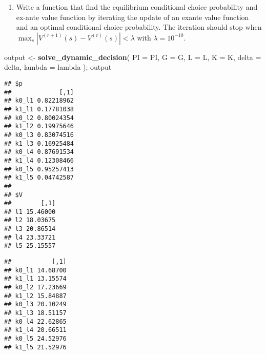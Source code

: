 \documentclass[
]{book}
\newenvironment{Shaded}{\begin{snugshade}}{\end{snugshade}}
\newcommand{\AttributeTok}[1]{\textcolor[rgb]{0.13,0.29,0.53}{#1}}
\newcommand{\FunctionTok}[1]{\textcolor[rgb]{0.13,0.29,0.53}{\textbf{#1}}}
\newcommand{\NormalTok}[1]{#1}
\newcommand{\OtherTok}[1]{\textcolor[rgb]{0.56,0.35,0.01}{#1}}
\newcommand{\SpecialCharTok}[1]{\textcolor[rgb]{0.81,0.36,0.00}{\textbf{#1}}}
\providecommand{\tightlist}{%
  \setlength{\itemsep}{0pt}\setlength{\parskip}{0pt}}
\begin{document}
\begin{enumerate}
\def\labelenumi{\arabic{enumi}.}
\setcounter{enumi}{5}
\tightlist
\item
  Write a function that find the equilibrium conditional choice probability and ex-ante value function by iterating the update of an exante value function and an optimal conditional choice probability. The iteration should stop when \(\max_s|V^{(r + 1)}(s) - V^{(r)}(s)| < \lambda\) with \(\lambda = 10^{-10}\).
\end{enumerate}

\begin{Shaded}
\begin{Highlighting}[]
\NormalTok{output }\OtherTok{\textless{}{-}} 
  \FunctionTok{solve\_dynamic\_decision}\NormalTok{(}
    \AttributeTok{PI =}\NormalTok{ PI, }
    \AttributeTok{G =}\NormalTok{ G, }
    \AttributeTok{L =}\NormalTok{ L, }
    \AttributeTok{K =}\NormalTok{ K, }
    \AttributeTok{delta =}\NormalTok{ delta, }
    \AttributeTok{lambda =}\NormalTok{ lambda}
\NormalTok{    ); }
\NormalTok{output}
\end{Highlighting}
\end{Shaded}

\begin{verbatim}
## $p
##             [,1]
## k0_l1 0.82218962
## k1_l1 0.17781038
## k0_l2 0.80024354
## k1_l2 0.19975646
## k0_l3 0.83074516
## k1_l3 0.16925484
## k0_l4 0.87691534
## k1_l4 0.12308466
## k0_l5 0.95257413
## k1_l5 0.04742587
## 
## $V
##        [,1]
## l1 15.46000
## l2 18.03675
## l3 20.86514
## l4 23.33721
## l5 25.15557
\end{verbatim}

\begin{Shaded}
\end{Shaded}

\begin{verbatim}
##           [,1]
## k0_l1 14.68700
## k1_l1 13.15574
## k0_l2 17.23669
## k1_l2 15.84887
## k0_l3 20.10249
## k1_l3 18.51157
## k0_l4 22.62865
## k1_l4 20.66511
## k0_l5 24.52976
## k1_l5 21.52976
\end{verbatim}
\end{document}
